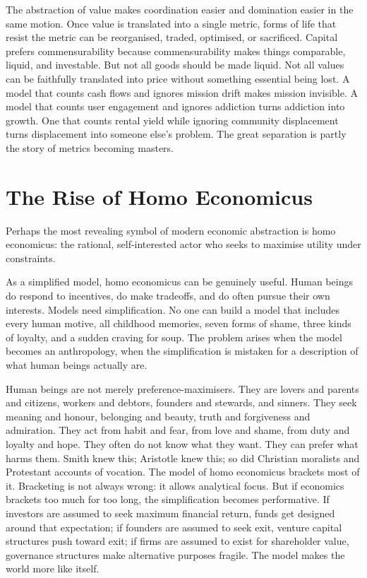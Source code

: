 \documentclass[11pt,a4paper,oneside]{book}
\begin{document}
The abstraction of value makes coordination easier and domination easier in the same motion. Once value is translated into a single metric, forms of life that resist the metric can be reorganised, traded, optimised, or sacrificed. Capital prefers commensurability because commensurability makes things comparable, liquid, and investable. But not all goods should be made liquid. Not all values can be faithfully translated into price without something essential being lost. A model that counts cash flows and ignores mission drift makes mission invisible. A model that counts user engagement and ignores addiction turns addiction into growth. One that counts rental yield while ignoring community displacement turns displacement into someone else's problem. The great separation is partly the story of metrics becoming masters.

\section*{The Rise of Homo Economicus}

Perhaps the most revealing symbol of modern economic abstraction is homo economicus: the rational, self-interested actor who seeks to maximise utility under constraints.

As a simplified model, homo economicus can be genuinely useful. Human beings do respond to incentives, do make tradeoffs, and do often pursue their own interests. Models need simplification. No one can build a model that includes every human motive, all childhood memories, seven forms of shame, three kinds of loyalty, and a sudden craving for soup. The problem arises when the model becomes an anthropology, when the simplification is mistaken for a description of what human beings actually are.

Human beings are not merely preference-maximisers. They are lovers and parents and citizens, workers and debtors, founders and stewards, and sinners. They seek meaning and honour, belonging and beauty, truth and forgiveness and admiration. They act from habit and fear, from love and shame, from duty and loyalty and hope. They often do not know what they want. They can prefer what harms them. Smith knew this; Aristotle knew this; so did Christian moralists and Protestant accounts of vocation. The model of homo economicus brackets most of it. Bracketing is not always wrong: it allows analytical focus. But if economics brackets too much for too long, the simplification becomes performative. If investors are assumed to seek maximum financial return, funds get designed around that expectation; if founders are assumed to seek exit, venture capital structures push toward exit; if firms are assumed to exist for shareholder value, governance structures make alternative purposes fragile. The model makes the world more like itself.
\end{document}
